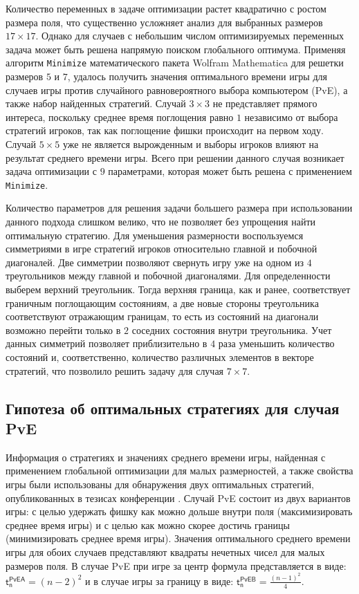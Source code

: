 Количество переменных в задаче оптимизации растет квадратично с ростом размера поля, что существенно усложняет анализ для выбранных размеров $17 \times 17$. Однако для случаев с небольшим числом оптимизируемых переменных задача может быть решена напрямую поиском глобального оптимума. Применяя алгоритм \texttt{Minimize} математического пакета Wolfram Mathematica для решетки размеров $5$ и $7$, удалось получить значения оптимального времени игры для случаев игры против случайного равновероятного выбора компьютером (PvE), а также набор найденных стратегий. Случай $3 \times 3$ не представляет прямого интереса, поскольку среднее время поглощения равно $1$ независимо от выбора стратегий игроков, так как поглощение фишки происходит на первом ходу. Случай $5 \times 5$ уже не является вырожденным и выборы игроков влияют на результат среднего времени игры. Всего при решении данного случая возникает задача оптимизации с $9$ параметрами, которая может быть решена с применением \texttt{Minimize}.

Количество параметров для решения задачи большего размера при использовании данного подхода слишком велико, что не позволяет без упрощения найти оптимальную стратегию. Для уменьшения размерности воспользуемся симметриями в игре стратегий игроков относительно главной и побочной диагоналей. Две симметрии позволяют свернуть игру уже на одном из $4$ треугольников между главной и побочной диагоналями. Для определенности выберем верхний треугольник. Тогда верхняя граница, как и ранее, соответствует граничным поглощающим состояниям, а две новые стороны треугольника соответствуют отражающим границам, то есть из состояний на диагонали возможно перейти только в $2$ соседних состояния внутри треугольника. Учет данных симметрий позволяет приблизительно в $4$ раза уменьшить количество состояний и, соответственно, количество различных элементов в векторе стратегий, что позволило решить задачу для случая $7 \times 7$. 

\subsection{Гипотеза об оптимальных стратегиях для случая PvE}\label{subsec:ch3/sec3/sub3}

Информация о стратегиях и значениях среднего времени игры, найденная с применением глобальной оптимизации для малых размерностей, а также свойства игры были использованы для обнаружения двух оптимальных стратегий, опубликованных в тезисах конференции \cite{confbib1}. Случай PvE состоит из двух вариантов игры: с целью удержать фишку как можно дольше внутри поля (максимизировать среднее время игры) и с целью как можно скорее достичь границы (минимизировать среднее время игры). Значения оптимального среднего времени игры для обоих случаев представляют квадраты нечетных чисел для малых размеров поля. В случае PvE при игре за центр формула представляется в виде: $\boldsymbol{\mathsf{t_n^{PvE A}}} = (n-2)^2$ и в случае игры за границу в виде: $\boldsymbol{\mathsf{t_n^{PvE B}}} = \frac{(n-1)^2}{4}$. 

